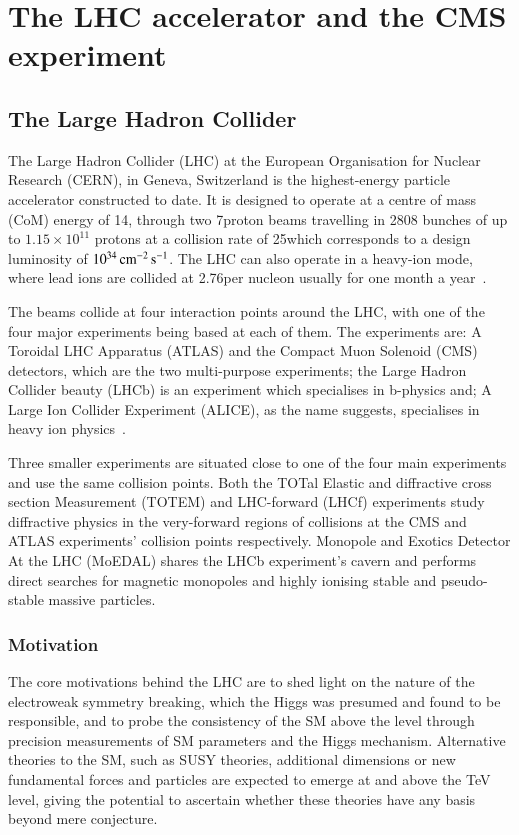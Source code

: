 \section{The LHC accelerator and the CMS experiment}\label{sec:lhc-cms}
\subsection{The Large Hadron Collider}\label{subsec:lhc}

The Large Hadron Collider (LHC) at the European Organisation for Nuclear Research (CERN), in Geneva, Switzerland is the highest-energy particle accelerator constructed to date. 
It is designed to operate at a centre of mass (CoM) energy of 14\TeV, through two 7\TeV proton beams travelling in 2808 bunches of up to $1.15 \times 10^{11}$ protons at a collision rate of 25\nsm which corresponds to a design luminosity of $10^{34}\,\text{cm}^\text{$-$2}\,\text{s}^\text{$-$1}$. 
The LHC can also operate in a heavy-ion mode, where lead ions are collided at 2.76\TeV per nucleon usually for one month a year~\cite{Bayatian:2006zz}.

The beams collide at four interaction points around the LHC, with one of the four major experiments being based at each of them. 
The experiments are: A Toroidal LHC Apparatus (ATLAS) and the Compact Muon Solenoid (CMS) detectors, which are the two multi-purpose experiments; the Large Hadron Collider beauty (LHCb) is an experiment which specialises in b-physics and; A Large Ion Collider Experiment (ALICE), as the name suggests, specialises in heavy ion physics~\cite{Bruning:782076}.

Three smaller experiments are situated close to one of the four main experiments and use the same collision points.
Both the TOTal Elastic and diffractive cross section Measurement (TOTEM) and LHC-forward (LHCf) experiments study diffractive physics in the very-forward regions of collisions at the CMS and ATLAS experiments' collision points respectively.
Monopole and Exotics Detector At the LHC (MoEDAL) shares the LHCb experiment's cavern and performs direct searches for magnetic monopoles and highly ionising stable and pseudo-stable massive particles.

\subsubsection{Motivation}
The core motivations behind the LHC are to shed light on the nature of the electroweak symmetry breaking, which the Higgs was presumed and found to be responsible, and to probe the consistency of the SM above the \TeV level through precision measurements of SM parameters and the Higgs mechanism.
Alternative theories to the SM, such as SUSY theories, additional dimensions or new fundamental forces and particles are expected to emerge at and above the TeV level, giving the potential to ascertain whether these theories have any basis beyond mere conjecture.

